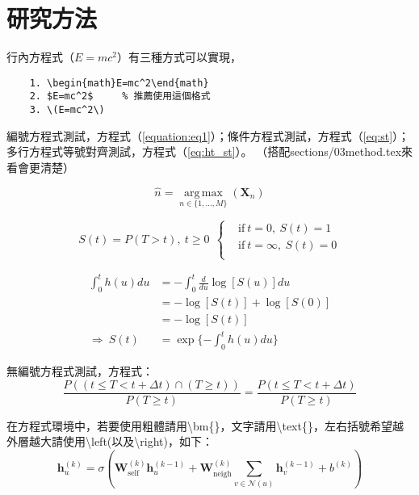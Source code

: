 
\section{研究方法}

行內方程式（$E=mc^2$）有三種方式可以實現，
\begin{verbatim}
    1. \begin{math}E=mc^2\end{math}
    2. $E=mc^2$     % 推薦使用這個格式
    3. \(E=mc^2\)
\end{verbatim}

編號方程式測試，方程式（\ref{equation:eq1}）；條件方程式測試，方程式（\ref{eq:st}）；
多行方程式等號對齊測試，方程式（\ref{eq:ht_st}）。
（搭配sections/03method.tex來看會更清楚）

\begin{equation}
    \label{equation:eq1}
    \hat{n}=\operatorname*{arg\,max}_{n\in \{1,\dots,M\}}(\mathbf{X}_{n})
\end{equation}

\begin{equation}
    S(t) = P(T > t),\ t \geq 0 \ \
    \begin{cases}
        & \text{if}\ t=0,\ S(t)=1 \\
        & \text{if}\ t=\infty,\ S(t)=0 \\
    \end{cases}
    \label{eq:st}
\end{equation}

\begin{equation}
    \begin{aligned}
        \int_{0}^{t}h(u)du & = -\int_{0}^{t}\frac{d}{du}\log[S(u)]du \\
                           & = -\log[S(t)] + \log[S(0)] \\
                           & = -\log[S(t)] \\
        \Rightarrow\ S(t)  & = \exp\{-\int_{0}^{t}h(u)du\}
    \end{aligned}
    \label{eq:ht_st}
\end{equation}

無編號方程式測試，方程式：
$$ \frac{P\left((t \leq T < t + \Delta t) \cap (T \geq t)\right)}{P(T \geq t)} = \frac{P(t \leq T < t + \Delta t)}{P(T \geq t)} $$

在方程式環境中，若要使用粗體請用\textbackslash bm\{\}，文字請用\textbackslash text\{\}，左右括號希望越外層越大請使用\textbackslash left(以及\textbackslash right)，如下：
$$ \bm{h}^{(k)}_u = \sigma\left(\bm{W}^{(k)}_{\text{self}}\bm{h}^{(k-1)}_u + \bm{W}^{(k)}_{\text{neigh}}\sum_{v \in \mathcal{N}(u)}\bm{h}^{(k-1)}_v + b^{(k)}\right) $$


